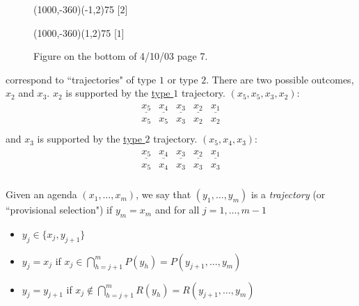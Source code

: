 \documentclass[12pt]{article}
\newcommand{\n}{\noindent}
\newcommand{\s}{\vspace{5mm}}
\begin{document}
\begin{figure}[htb]
\begin{egame}
\renewcommand{\egarrowstyle}{}

\putbranch(1000,-360)(-1,2){75}
[$2$]

\renewcommand{\egarrowstyle}{}

\putbranch(1000,-360)(1,2){75}
[$1$]






%
\end{egame}
\hspace*{\fill}\s\s\s\s\s\s\s\s\s\s\s\s
\caption[]{Figure on the bottom of 4/10/03 page 7.}\label{f:thirteen}
\end{figure}

\n correspond to ``trajectories" of type $1$ or type $2$.  There are two possible outcomes, $x_2$ and $x_3$.  $x_2$ is supported by the \underline{type $1$} trajectory.  $(x_5,x_5,x_3,x_2)$:
\begin{eqnarray*}
\begin{array}{ccccc}
\underline{x_5}&\underline{x_4}&\underline{x_3}&\underline{x_2}&\underline{x_1}\\
x_5&x_5&x_3&x_2&x_2\\
\end{array}
\end{eqnarray*}\n and $x_3$ is supported by the \underline{type $2$} trajectory. $(x_5,x_4,x_3)$:
\begin{eqnarray*}
\begin{array}{ccccc}
\underline{x_5}&\underline{x_4}&\underline{x_3}&\underline{x_2}&\underline{x_1}\\
x_5&x_4&x_3&x_3&x_3\\
\end{array}
\end{eqnarray*}

\s
\n  Given an agenda $(x_1,\hdots,x_m)$, we say that  $(y_1,\hdots,y_m)$ is a \textit{trajectory} (or ``provisional selection") if $y_m=x_m$ and for all $j=1,\hdots,m-1$
\begin{itemize}
\item $y_j\in\{x_j,y_{j+1}\}$
\item $y_j=x_j$ if $x_j\in\bigcap_{h=j+1}^m P(y_h)=P(y_{j+1},\hdots,y_m)$
\item $y_j=y_{j+1}$ if $x_j\notin\bigcap_{h=j+1}^mR(y_h)=R(y_{j+1},\hdots,y_m)$
\end{itemize}
\end{document}
